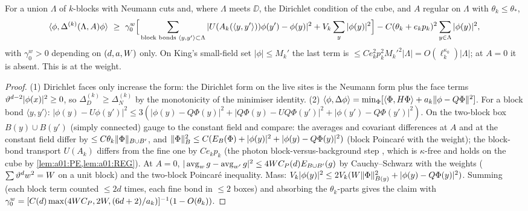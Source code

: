 \begin{lemma}\label{lem:a01:329}
For a union $\Lambda$ of $k$-blocks with Neumann cuts and, where $\Lambda$ meets $\DD$, the Dirichlet condition of the cube, and $A$ regular on $\Lambda$ with $\theta_k\le\theta_*$,
\[
\ip\phi{\Delta^{(k)}(\Lambda,A)\phi}\ \ge\ \gamma_0^{w}\Big[\sum_{\text{block bonds }\langle y,y'\rangle\subset\Lambda}|U(A_k(\langle y,y'\rangle))\phi(y')-\phi(y)|^2+V_k\sum_y|\phi(y)|^2\Big]-C(\theta_k+e_kp_k)^2\sum_{y\in\Lambda}|\phi(y)|^2,
\]
with $\gamma_0^w>0$ depending on $(d,a,W)$ only. On King's small-field set $|\phi|\le M_k'$ the last term is $\le Ce_k^2p_k^2M_k'^2|\Lambda|=O(\ell_k^{\kappa_0})|\Lambda|$; at $A=0$ it is absent. This is \cite[(3.29)]{Ba2} at the weight.
\end{lemma}
\begin{proof}
(1) Dirichlet faces only increase the form: the Dirichlet form on the live sites is the Neumann form plus the face terms $\vartheta^{d-2}|\phi(x)|^2\ge0$, so $\Delta^{(k)}_D\ge\Delta^{(k)}_N$ by the monotonicity of the minimiser identity. (2) $\langle \phi,\Delta\phi\rangle=\min_\Phi[\langle \Phi,H\Phi\rangle+a_k\lVert \phi-Q\Phi\rVert^2]$. For a block bond $\langle y,y'\rangle$: $|\phi(y)-U\phi(y')|^2\le3(|\phi(y)-Q\Phi(y)|^2+|Q\Phi(y)-UQ\Phi(y')|^2+|\phi(y')-Q\Phi(y')|^2)$. On the two-block box $B(y)\cup B(y')$ (simply connected) gauge to the constant field and compare: the averages and covariant differences at $A$ and at the constant field differ by $\le C\theta_k\lVert \Phi\rVert_{B\cup B'}$, and $\lVert \Phi\rVert_B^2\le C(E_B(\Phi)+|\phi(y)|^2+|\phi(y)-Q\Phi(y)|^2)$ (block Poincar\'e with the weight); the block-bond transport $U(A_k)$ differs from the fine one by $Ce_kp_k$ (the photon block-versus-background step \cite[(A.2)--(A.6)]{K1}, which is $\kappa$-free and holds on the cube by \cref{lem:a01:PE,lem:a01:REG}). At $A=0$, $|\operatorname{avg}_wg-\operatorname{avg}_{w'}g|^2\le4W C_P(d)E_{B\cup B'}(g)$ by Cauchy--Schwarz with the weights ($\sum\vartheta^dw^2=W$ on a unit block) and the two-block Poincar\'e inequality. Mass: $V_k|\phi(y)|^2\le2V_k(W\lVert \Phi\rVert^2_{B(y)}+|\phi(y)-Q\Phi(y)|^2)$. Summing (each block term counted $\le2d$ times, each fine bond in $\le2$ boxes) and absorbing the $\theta_k$-parts gives the claim with $\gamma_0^w=[C(d)\max(4W C_P,2W,(6d+2)/a_k)]^{-1}(1-O(\theta_k))$.
\end{proof}


